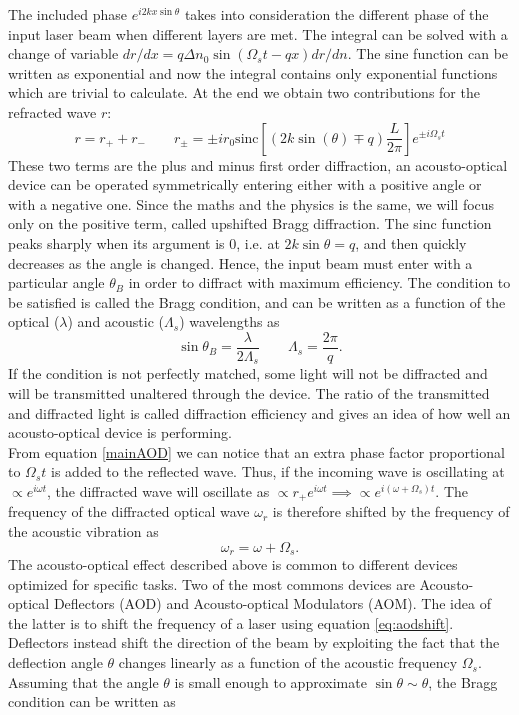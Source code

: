 The included phase $e^{i2kx \sin\theta}$ takes into consideration the different phase of the input laser beam when different layers are met. The integral can be solved with a change of variable $dr/dx = q \Delta n_0 \sin \left(\Omega_s t - qx \right)dr/dn $. The sine function can be written as exponential and now the integral contains only exponential functions which are trivial to calculate. At the end we obtain two contributions for the refracted wave $r$:
\begin{equation}
\label{mainAOD}
r = r_+ + r_- \qquad r_\pm = \pm i r_0 \text{sinc} \left[(2k\sin(\theta) \mp q)\frac{L}{2\pi} \right]e^{\pm i\Omega_s t}
\end{equation}
These two terms are the plus and minus first order diffraction, an acousto-optical device can be operated symmetrically entering either with a positive angle or with a negative one. Since the maths and the physics is the same, we will focus only on the positive term, called upshifted Bragg diffraction. The sinc function peaks sharply when its argument is 0, i.e. at $2k\sin\theta = q$, and then quickly decreases as the angle is changed. Hence, the input beam must enter with a particular angle $\theta_B$ in order to diffract with maximum efficiency. The condition to be satisfied is called the Bragg condition, and can be written as a function of the optical ($\lambda$) and acoustic ($\Lambda_s$) wavelengths as
\begin{equation}
\label{braggcondition}
\sin \theta_B  = \frac{\lambda}{2 \Lambda_s} \qquad \Lambda_s = \frac{2\pi}{q}.
\end{equation}
If the condition is not perfectly matched, some light will not be diffracted and will be transmitted unaltered through the device.
The ratio of the transmitted and diffracted light is called diffraction efficiency and gives an idea of how well an acousto-optical device is performing.\\
From equation \eqref{mainAOD} we can notice that an extra phase factor proportional to $\Omega_s t$ is added to the reflected wave. Thus, if the incoming wave is oscillating at $\propto e^{i\omega t}$, the diffracted wave will oscillate as $\propto r_{+}e^{i\omega t} \implies \propto e^{i(\omega + \Omega_s )t}$. The frequency of the diffracted optical wave $\omega_r$ is therefore shifted by the frequency of the acoustic vibration as
\begin{equation}
\label{eq:aodshift}
\omega_r  =  \omega + \Omega_s.
\end{equation}
The acousto-optical effect described above is common to different devices optimized for specific tasks. Two of the most commons devices are Acousto-optical Deflectors (AOD) and Acousto-optical Modulators (AOM). The idea of the latter is to shift the frequency of a laser using equation \eqref{eq:aodshift}. Deflectors instead shift the direction of the beam by exploiting the fact that the deflection angle $\theta$ changes linearly as a function of the acoustic frequency $\Omega_s$. Assuming that the angle $\theta$ is small enough to approximate $\sin\theta \sim \theta$, the Bragg condition can be written as
